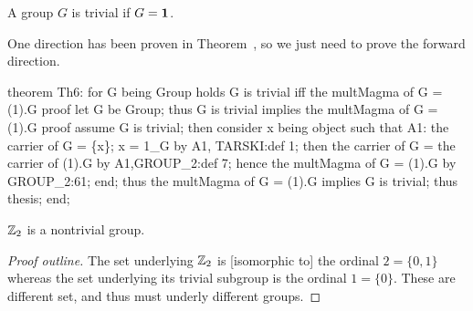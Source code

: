 \begin{theorem}\label{thm:preparatory:trivialIff1}
A group $G$ is trivial if $G=\mathbf{1}$.
\end{theorem}

One direction has been proven in Theorem~, so we just
need to prove the forward direction.



\nwenddocs{}\endmoddef\nwstartdeflinemarkup{}\nwenddeflinemarkup
theorem Th6:
  for G being Group
  holds G is trivial iff the multMagma of G = (1).G
proof
  let G be Group;
  thus G is trivial implies the multMagma of G = (1).G
  proof
    assume G is trivial;
    then consider x being object such that
    A1: the carrier of G = \{x\};
    x = 1_G by A1, TARSKI:def 1;
    then the carrier of G = the carrier of (1).G by A1,GROUP_2:def 7;
    hence the multMagma of G = (1).G by GROUP_2:61;
  end;
  thus the multMagma of G = (1).G implies G is trivial;
  thus thesis;
end;
\eatline
{}\nwendcode{}\nwdocspar
\begin{lemma}
$\mathbb{Z}_{2}$ is a nontrivial group.
\end{lemma}

\begin{proof}[Proof outline]
The set underlying $\mathbb{Z}_{2}$ is [isomorphic to] the ordinal
$2=\{0,1\}$ whereas the set underlying its trivial subgroup is the
ordinal $1=\{0\}$. These are different set, and thus must underly
different groups.
\end{proof}

